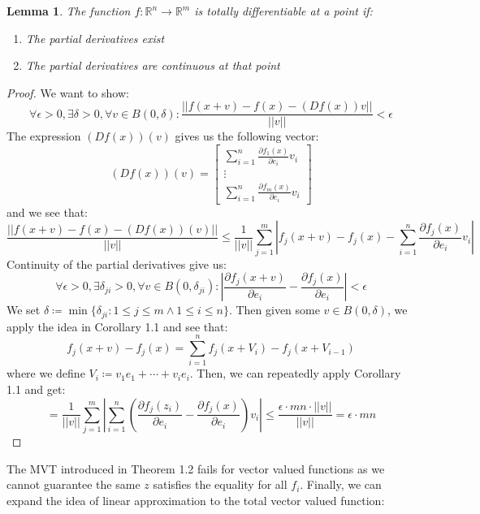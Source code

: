 \documentclass[10pt,letterpaper]{article} %
\newtheorem{lem}{Lemma}[section]
\begin{document}
\begin{lem}
The function $f: \mathbb{R}^n \xrightarrow{} \mathbb{R}^m$ is totally differentiable at a point if:
\begin{enumerate}
\item The partial derivatives exist
\item The partial derivatives are continuous at that point
\end{enumerate}
\end{lem}
\begin{proof}
We want to show:
\begin{equation*}
\forall \epsilon > 0, \exists \delta > 0, \forall v \in B(0, \delta): \frac{||f(x+v) - f(x) - (Df(x))v||}{||v||} < \epsilon
\end{equation*}
The expression $(Df(x))(v)$ gives us the following vector:
\begin{equation*}
(Df(x))(v) = \begin{bmatrix}
\sum_{i=1}^{n}\frac{\partial f_1(x)}{\partial e_i}v_i\\
\vdots\\
\sum_{i=1}^{n}\frac{\partial f_m(x)}{\partial e_i}v_i
\end{bmatrix}
\end{equation*}
and we see that:
\begin{equation*}
\frac{||f(x+v) - f(x) - (Df(x))(v)||}{||v||} \leqslant \frac{1}{||v||}\sum_{j=1}^{m}\left|f_j(x+v) - f_j(x) - \sum_{i=1}^{n}\frac{\partial f_j(x)}{\partial e_i}v_i\right|
\end{equation*}
Continuity of the partial derivatives give us:
\begin{equation*}
\forall \epsilon > 0, \exists \delta_{ji} > 0, \forall v \in B(0, \delta_{ji}): \left|\frac{\partial f_j(x+v)}{\partial e_i} - \frac{\partial f_j(x)}{\partial e_i}\right| < \epsilon
\end{equation*}
We set $\delta \coloneq \min\{\delta_{ji} : 1 \leqslant j \leqslant m \land 1 \leqslant i \leqslant n\}$. Then given some $v \in B(0, \delta)$, we apply the idea in Corollary 1.1 and see that:
\begin{equation*}
f_j(x+v) - f_j(x) = \sum_{i=1}^{n}f_j(x + V_i) - f_j(x + V_{i-1})
\end{equation*}
where we define $V_i \coloneq v_1e_1 + \cdots + v_ie_i$. Then, we can repeatedly apply Corollary 1.1 and get:
\begin{equation*}
= \frac{1}{||v||}\sum_{j=1}^{m}\left|\sum_{i=1}^{n}\left(\frac{\partial f_j(z_i)}{\partial e_i} - \frac{\partial f_j(x)}{\partial e_i}\right)v_i\right| \leqslant \frac{\epsilon \cdot mn \cdot ||v||}{||v||} = \epsilon \cdot mn
\end{equation*}
\end{proof}
The MVT introduced in Theorem 1.2 fails for vector valued functions as we cannot guarantee the same $z$ satisfies the equality for all $f_i$. Finally, we can expand the idea of linear approximation to the total vector valued function:
\end{document}
